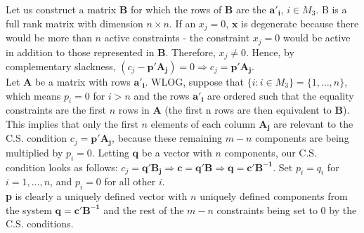 \documentclass{article}
\begin{document}
\noindent Let us construct a matrix $\mathbf{B}$ for which the rows of $\mathbf{B}$ are the $\mathbf{a'_i}$, $i \in M_3$.  B is a full rank matrix with dimension $n \times n$.  If an $x_j = 0$, $\mathbf{x}$ is degenerate because there would be more than $n$ active constraints - the constraint $x_j = 0$ would be active in addition to those represented in $\mathbf{B}$.  Therefore, $x_j \neq 0$.  Hence, by complementary slackness, $(c_j - \mathbf{p' A_j}) = 0 \Rightarrow c_j = \mathbf{p'A_j}$.  \\

\noindent Let $\mathbf{A}$ be a matrix with rows $\mathbf{a'_i}$.  
WLOG, suppose that $\{i:  i \in M_3\} = \{1, \ldots, n\}$, which means $p_i = 0$ for $i > n$ and the rows $\mathbf{a'_i}$ are ordered such that the equality constraints are the first $n$ rows in $\mathbf{A}$ (the first n rows are then equivalent to $\mathbf{B}$).  This implies that only the first $n$ elements of each column $\mathbf{A_j}$ are relevant to the C.S. condition $c_j = \mathbf{p'A_j}$, because these remaining $m-n$ components are being multiplied by $p_i = 0$.  Letting $\mathbf{q}$ be a vector with $n$ components, our C.S. condition looks as follows:  $c_j =\mathbf{q' B_j} \Rightarrow \mathbf{c = q' B} \Rightarrow \mathbf{q = c' B^{-1}}$.  Set $p_i = q_i$ for $i = 1, \ldots, n$, and $p_i = 0$ for all other $i$.  \\

\noindent \textbf{p} is clearly a uniquely defined vector with $n$ uniquely defined components from the system $\mathbf{q = c' B^{-1}}$ and the rest of the $m-n$ constraints being set to 0 by the C.S. conditions.\\
 
\end{document}
